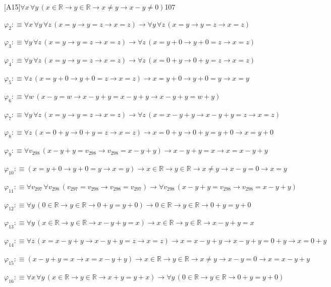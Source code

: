\begin{fullproof}{[A15]}{$\forall x\,\forall y\,(x \in \mathbb{R} \to y \in \mathbb{R} \to x \neq y \to x - y \neq 0)$}{107}
\begin{abbrevlist}
\item $\varphi_{2} :\equiv \forall x\,\forall y\,\forall z\,(x = y \to y = z \to x = z) \to \forall y\,\forall z\,(x = y \to y = z \to x = z)$
\item $\varphi_{3} :\equiv \forall y\,\forall z\,(x = y \to y = z \to x = z) \to \forall z\,(x = y + 0 \to y + 0 = z \to x = z)$
\item $\varphi_{4} :\equiv \forall y\,\forall z\,(x = y \to y = z \to x = z) \to \forall z\,(x = 0 + y \to 0 + y = z \to x = z)$
\item $\varphi_{5} :\equiv \forall z\,(x = y + 0 \to y + 0 = z \to x = z) \to x = y + 0 \to y + 0 = y \to x = y$
\item $\varphi_{6} :\equiv \forall w\,(x - y = w \to x - y + y = x - y + y \to x - y + y = w + y)$
\item $\varphi_{7} :\equiv \forall y\,\forall z\,(x = y \to y = z \to x = z) \to \forall z\,(x = x - y + y \to x - y + y = z \to x = z)$
\item $\varphi_{8} :\equiv \forall z\,(x = 0 + y \to 0 + y = z \to x = z) \to x = 0 + y \to 0 + y = y + 0 \to x = y + 0$
\item $\varphi_{9} :\equiv \forall v_{298}\,(x - y + y = v_{298} \to v_{298} = x - y + y) \to x - y + y = x \to x = x - y + y$
\item $\varphi_{10} :\equiv (x = y + 0 \to y + 0 = y \to x = y) \to x \in \mathbb{R} \to y \in \mathbb{R} \to x \neq y \to x - y = 0 \to x = y$
\item $\varphi_{11} :\equiv \forall v_{297}\,\forall v_{298}\,(v_{297} = v_{298} \to v_{298} = v_{297}) \to \forall v_{298}\,(x - y + y = v_{298} \to v_{298} = x - y + y)$
\item $\varphi_{12} :\equiv \forall y\,(0 \in \mathbb{R} \to y \in \mathbb{R} \to 0 + y = y + 0) \to 0 \in \mathbb{R} \to y \in \mathbb{R} \to 0 + y = y + 0$
\item $\varphi_{13} :\equiv \forall y\,(x \in \mathbb{R} \to y \in \mathbb{R} \to x - y + y = x) \to x \in \mathbb{R} \to y \in \mathbb{R} \to x - y + y = x$
\item $\varphi_{14} :\equiv \forall z\,(x = x - y + y \to x - y + y = z \to x = z) \to x = x - y + y \to x - y + y = 0 + y \to x = 0 + y$
\item $\varphi_{15} :\equiv (x - y + y = x \to x = x - y + y) \to x \in \mathbb{R} \to y \in \mathbb{R} \to x \neq y \to x - y = 0 \to x = x - y + y$
\item $\varphi_{16} :\equiv \forall x\,\forall y\,(x \in \mathbb{R} \to y \in \mathbb{R} \to x + y = y + x) \to \forall y\,(0 \in \mathbb{R} \to y \in \mathbb{R} \to 0 + y = y + 0)$

\end{abbrevlist}
\end{fullproof}

